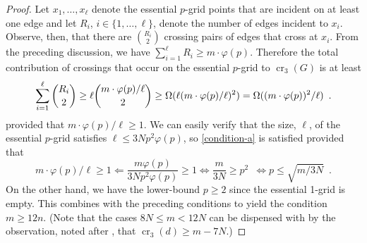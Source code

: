 \documentclass{patmorin}
\newcommand{\n}{N}
\DeclareMathOperator{\crs}{cr}
\begin{document}
\begin{proof}
  Let $x_1,\ldots,x_\ell$ denote the essential $p$-grid points that are
  incident on at least one edge and let $R_i$, $i\in\{1,\ldots,\ell\}$,
  denote the number of edges incident to $x_i$.  Observe, then, that
  there are $\binom{R_i}{2}$ crossing pairs of edges that cross at
  $x_i$.  From the preceding discussion, we have $\sum_{i=1}^\ell R_i
  \ge m\cdot\varphi(p)$.  Therefore the total contribution of crossings that
  occur on the essential $p$-grid to $\crs_3(G)$ is at least
  \begin{equation}
      \sum_{i=1}^\ell\binom{R_i}{2} \ge \ell \binom{m\cdot\varphi(p)/\ell}{2}
      \ge \Omega(\ell (m\cdot\varphi(p)/\ell)^2)
      = \Omega((m\cdot\varphi(p))^2/\ell) \enspace . \eqlabel{condition-a}
  \end{equation}
  provided that $m\cdot\varphi(p)/\ell \ge 1$.  We can easily verify
  that the size, $\ell$, of the essential $p$-grid satisfies $\ell \le
  3\n p^2\varphi(p)$, so \eqref{condition-a} is satisfied provided that
  \[
     m\cdot\varphi(p)/\ell \ge 1 \Leftarrow \frac{m\varphi(p)}{3\n p^2\varphi(p)} \ge 1 \Leftrightarrow \frac{m}{3\n} \ge p^2 \enspace \Leftrightarrow
   p \le \sqrt{m/3\n} \enspace .
  \]
  On the other hand, we have the lower-bound $p\ge 2$ since the essential
  1-grid is empty.  This combines with the preceding conditions to
  yield the condition $m\ge 12n$.  (Note that the cases $8\n\le m< 12\n$
  can be dispensed with by the observation, noted after ,
  that $\crs_3(d) \ge m-7\n$.)


\end{proof}
\end{document}
